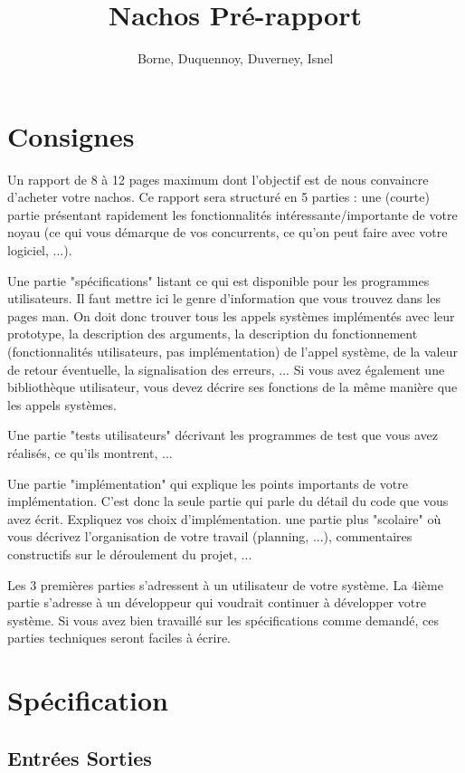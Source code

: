 \documentclass[11pt]{article}
\author{Borne, Duquennoy, Duverney, Isnel}
\date{}
\title{Nachos Pré-rapport}
\begin{document}
\maketitle
\section{Consignes}
Un rapport de 8 à 12 pages maximum dont l'objectif est de nous convaincre d'acheter votre nachos. Ce rapport sera structuré en 5 parties :
une (courte) partie présentant rapidement les fonctionnalités intéressante/importante de votre noyau (ce qui vous démarque de vos concurrents, ce qu'on peut faire avec votre logiciel, ...).

Une partie "spécifications" listant ce qui est disponible pour les programmes utilisateurs.
Il faut mettre ici le genre d'information que vous trouvez dans les pages man.
On doit donc trouver tous les appels systèmes implémentés avec leur prototype, la description des arguments,
la description du fonctionnement (fonctionnalités utilisateurs, pas implémentation) de l'appel système,
de la valeur de retour éventuelle, la signalisation des erreurs, ...
Si vous avez également une bibliothèque utilisateur, vous devez décrire ses fonctions de la même manière que les appels systèmes.

Une partie "tests utilisateurs" décrivant les programmes de test que vous avez réalisés, ce qu'ils montrent, ...

Une partie "implémentation" qui explique les points importants de votre implémentation. C'est donc la seule partie qui parle du détail du code que vous avez écrit. Expliquez vos choix d'implémentation.
une partie plus "scolaire" où vous décrivez l'organisation de votre travail (planning, ...), commentaires constructifs sur le déroulement du projet, ...

Les 3 premières parties s'adressent à un utilisateur de votre système. La 4ième partie s'adresse à un développeur qui voudrait continuer à développer votre système. Si vous avez bien travaillé sur les spécifications comme demandé, ces parties techniques seront faciles à écrire.









\section{Spécification}
\subsection{Entrées Sorties}
\end{document}

